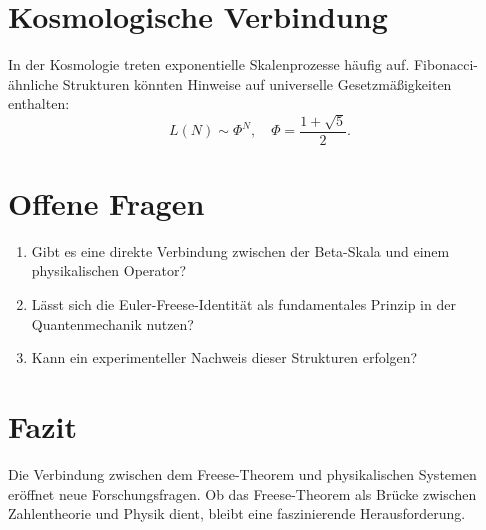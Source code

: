 \documentclass{article} %
\begin{document}
\section{Kosmologische Verbindung}
In der Kosmologie treten exponentielle Skalenprozesse häufig auf. Fibonacci-ähnliche Strukturen könnten Hinweise auf universelle Gesetzmäßigkeiten enthalten:
\begin{equation}
    L(N) \sim \Phi^N, \quad \Phi = \frac{1 + \sqrt{5}}{2}.
\end{equation}

\section{Offene Fragen}
\begin{enumerate}
    \item Gibt es eine direkte Verbindung zwischen der Beta-Skala und einem physikalischen Operator?
    \item Lässt sich die Euler-Freese-Identität als fundamentales Prinzip in der Quantenmechanik nutzen?
    \item Kann ein experimenteller Nachweis dieser Strukturen erfolgen?
\end{enumerate}

\section{Fazit}
Die Verbindung zwischen dem Freese-Theorem und physikalischen Systemen eröffnet neue Forschungsfragen. Ob das Freese-Theorem als Brücke zwischen Zahlentheorie und Physik dient, bleibt eine faszinierende Herausforderung.
\end{document}
